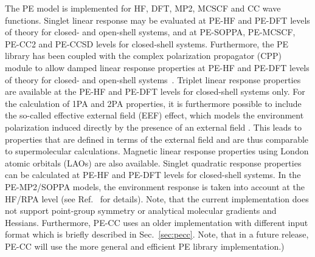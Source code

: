 The PE model is implemented for HF, DFT, MP2, MCSCF and
CC wave functions. Singlet linear response may be evaluated
at PE-HF and PE-DFT levels of theory for closed- and open-shell systems,
and at PE-SOPPA, PE-MCSCF, PE-CC2 and PE-CCSD levels for closed-shell systems.
Furthermore, the PE library has been coupled with the complex polarization
propagator (CPP) module to allow damped linear response properties at
PE-HF and PE-DFT levels of theory for closed- and open-shell systems~\cite{pecpp}.
Triplet linear response properties are
available at the PE-HF and PE-DFT levels for closed-shell systems
only. For the calculation of 1PA and 2PA properties, it is furthermore possible to include 
the so-called effective external field (EEF) effect, which models the environment polarization
induced directly by the presence of an external field \cite{peeef,peeef2}.
This leads to properties that are defined in terms of the external field and are thus comparable to
supermolecular calculations.
Magnetic linear response properties using London atomic
orbitals (LAOs) are also available. Singlet quadratic response properties can be
calculated at PE-HF and PE-DFT levels for closed-shell systems.
In the PE-MP2/SOPPA models, the
environment response is taken into account at the HF/RPA level
(see Ref.~\cite{pesoppa} for details). Note, that the current implementation
does not support point-group symmetry or analytical molecular gradients and Hessians.
Furthermore, PE-CC uses an older implementation with different input format which
is briefly described in Sec.~\ref{sec:pecc}. Note, that in a future release, PE-CC
will use the more general and efficient PE library implementation.)


